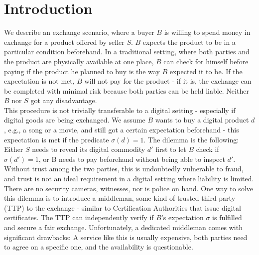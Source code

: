 \documentclass{cacthesis}
\newcounter{protocol}
\begin{document}
	\tableofcontents
	    
	\mainmatter
	
	\chapter{Introduction}
        We describe an exchange scenario, where a buyer $B$ is willing to spend money in exchange for a product offered by seller $S$. $B$ expects the product to be in a particular condition beforehand. In a traditional setting, where both parties and the product are physically available at one place, $B$ can check for himself before paying if the product he planned to buy is the way $B$ expected it to be. If the expectation is not met, $B$ will not pay for the product - if it is, the exchange can be completed with minimal risk because both parties can be held liable. Neither $B$ nor $S$ got any disadvantage. \\
        This procedure is not trivially transferable to a digital setting - especially if digital goods are being exchanged. We assume $B$ wants to buy a digital product $d$, e.g., a song or a movie, and still got a certain expectation beforehand - this expectation is met if the predicate $\sigma\left( d\right) =1$. The dilemma is the following: Either $S$ needs to reveal its digital commodity $d'$ first to let $B$ check if $\sigma\left( d'\right) =1$, or B needs to pay beforehand without being able to inspect $d'$. Without trust among the two parties, this is undoubtedly vulnerable to fraud, and trust is not an ideal requirement in a digital setting where liability is limited. There are no security cameras, witnesses, nor is police on hand. One way to solve this dilemma is to introduce a middleman, some kind of trusted third party (TTP) to the exchange - similar to Certification Authorities that issue digital certificates. The TTP can independently verify if $B$'s expectation $\sigma$ is fulfilled and secure a fair exchange. Unfortunately, a dedicated middleman comes with significant drawbacks: A service like this is usually expensive, both parties need to agree on a specific one, and the availability is questionable. \\\\
\end{document}
